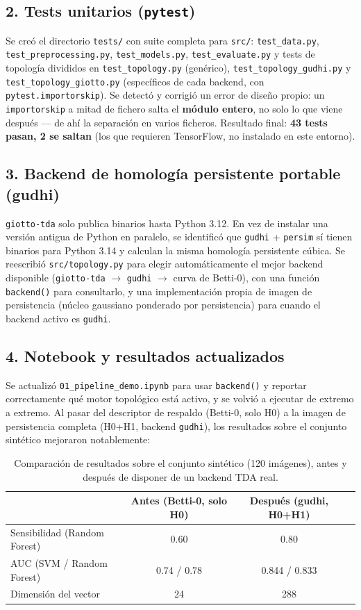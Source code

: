 \documentclass[11pt,a4paper]{article}
\begin{document}
\subsection*{2. Tests unitarios (\texttt{pytest})}
Se creó el directorio \texttt{tests/} con suite completa para
\texttt{src/}: \texttt{test\_data.py}, \texttt{test\_preprocessing.py},
\texttt{test\_models.py}, \texttt{test\_evaluate.py} y tests de topología
divididos en \texttt{test\_topology.py} (genérico),
\texttt{test\_topology\_gudhi.py} y \texttt{test\_topology\_giotto.py}
(específicos de cada backend, con \texttt{pytest.importorskip}).
Se detectó y corrigió un error de diseño propio: un \texttt{importorskip} a
mitad de fichero salta el \textbf{módulo entero}, no solo lo que viene
después --- de ahí la separación en varios ficheros.
Resultado final: \textbf{43 tests pasan, 2 se saltan} (los que requieren
TensorFlow, no instalado en este entorno).

\subsection*{3. Backend de homología persistente portable (gudhi)}
\texttt{giotto-tda} solo publica binarios hasta Python 3.12. En vez de
instalar una versión antigua de Python en paralelo, se identificó que
\texttt{gudhi} + \texttt{persim} sí tienen binarios para Python 3.14 y
calculan la misma homología persistente cúbica. Se reescribió
\texttt{src/topology.py} para elegir automáticamente el mejor backend
disponible (\texttt{giotto-tda} $\to$ \texttt{gudhi} $\to$ curva de Betti-0),
con una función \texttt{backend()} para consultarlo, y una implementación
propia de imagen de persistencia (núcleo gaussiano ponderado por
persistencia) para cuando el backend activo es \texttt{gudhi}.

\subsection*{4. Notebook y resultados actualizados}
Se actualizó \texttt{01\_pipeline\_demo.ipynb} para usar \texttt{backend()} y
reportar correctamente qué motor topológico está activo, y se volvió a
ejecutar de extremo a extremo. Al pasar del descriptor de respaldo (Betti-0,
solo H0) a la imagen de persistencia completa (H0+H1, backend \texttt{gudhi}),
los resultados sobre el conjunto sintético mejoraron notablemente:

\begin{table}[h]
\centering
\begin{tabular}{@{}lccc@{}}
\toprule
& \textbf{Antes (Betti-0, solo H0)} & \textbf{Después (gudhi, H0+H1)} \\
\midrule
Sensibilidad (Random Forest) & 0.60 & 0.80 \\
AUC (SVM / Random Forest)    & 0.74 / 0.78 & 0.844 / 0.833 \\
Dimensión del vector         & 24 & 288 \\
\bottomrule
\end{tabular}
\caption{Comparación de resultados sobre el conjunto sintético (120 imágenes),
antes y después de disponer de un backend TDA real.}
\end{table}
\end{document}
